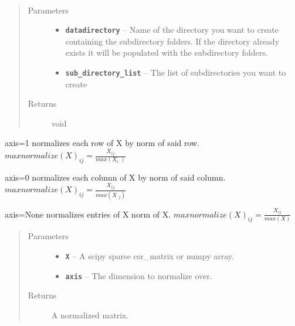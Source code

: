 \documentclass[letterpaper,10pt,english]{sphinxmanual}
\begin{document}

\begin{fulllineitems}
\label{loader:loader.makedirs}~\begin{quote}\begin{description}
\item[{Parameters}] \leavevmode\begin{itemize}
\item {} 
\textbf{\texttt{datadirectory}} -- Name of the directory you want to create containing the subdirectory folders.
If the directory already exists it will be populated with the subdirectory folders.

\item {} 
\textbf{\texttt{sub\_directory\_list}} -- The list of subdirectories you want to create

\end{itemize}

\item[{Returns}] \leavevmode
void

\end{description}\end{quote}

\end{fulllineitems}


\begin{fulllineitems}
\label{loader:loader.maxnormalize}
axis=1 normalizes each row of X by norm of said row. \(maxnormalize(X)_{ij} = \frac{X_{ij}}{max(X_{i:})}\)

axis=0 normalizes each column of X by norm of said column. \(maxnormalize(X)_{ij} = \frac{X_{ij}}{max(X_{
:j})}\)

axis=None normalizes entries of X  norm of X. \(maxnormalize(X)_{ij} = \frac{X_{ij}}{max(X)}\)
\begin{quote}\begin{description}
\item[{Parameters}] \leavevmode\begin{itemize}
\item {} 
\textbf{\texttt{X}} -- A scipy sparse csr\_matrix or numpy array.

\item {} 
\textbf{\texttt{axis}} -- The dimension to normalize over.

\end{itemize}

\item[{Returns}] \leavevmode
A normalized matrix.

\end{description}\end{quote}

\end{fulllineitems}
\end{document}
